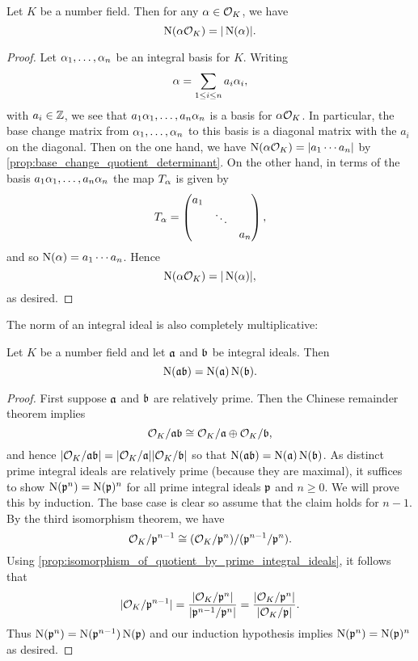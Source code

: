 \documentclass[12pt,oneside]{book}
\begin{document}
    \begin{proposition}\label{prop:ideal_and_field_norms_are_identical}
      Let $K$ be a number field. Then for any $\alpha \in \mathcal{O}_{K}$, we have
      \[
        \operatorname{\mathrm{N}}(\alpha\mathcal{O}_{K}) = |\operatorname{\mathrm{N}}(\alpha)|.
      \]
    \end{proposition}
    \begin{proof}
      Let $\alpha_{1},\ldots,\alpha_{n}$ be an integral basis for $K$. Writing
      \[
        \alpha = \sum_{1 \le i \le n}a_{i}\alpha_{i},
      \]
      with $a_{i} \in \mathbb{Z}$, we see that $a_{1}\alpha_{1},\ldots,a_{n}\alpha_{n}$ is a basis for $\alpha\mathcal{O}_{K}$. In particular, the base change matrix from $\alpha_{1},\ldots,\alpha_{n}$  to this basis is a diagonal matrix with the $a_{i}$ on the diagonal. Then on the one hand, we have $\operatorname{\mathrm{N}}(\alpha\mathcal{O}_{K}) = |a_{1} \cdots a_{n}|$ by \cref{prop:base_change_quotient_determinant}. On the other hand, in terms of the basis $a_{1}\alpha_{1},\ldots,a_{n}\alpha_{n}$ the map $T_{\alpha}$ is given by
      \[
        T_{\alpha} = \begin{pmatrix} a_{1} & & \\ & \ddots & \\ & & a_{n} \end{pmatrix},
      \]
      and so $\operatorname{\mathrm{N}}(\alpha) = a_{1} \cdots a_{n}$. Hence
      \[
        \operatorname{\mathrm{N}}(\alpha\mathcal{O}_{K}) = |\operatorname{\mathrm{N}}(\alpha)|,
      \]
      as desired.
    \end{proof}

    The norm of an integral ideal is also completely multiplicative:

    \begin{proposition}\label{prop:ideal_norm_is_multiplicative}
      Let $K$ be a number field and let $\mathfrak{a}$ and $\mathfrak{b}$ be integral ideals. Then
      \[
        \operatorname{\mathrm{N}}(\mathfrak{a}\mathfrak{b}) = \operatorname{\mathrm{N}}(\mathfrak{a})\operatorname{\mathrm{N}}(\mathfrak{b}).
      \]
    \end{proposition}
    \begin{proof}
      First suppose $\mathfrak{a}$ and $\mathfrak{b}$ are relatively prime. Then the Chinese remainder theorem implies
      \[
        \mathcal{O}_{K}/\mathfrak{a}\mathfrak{b} \cong \mathcal{O}_{K}/\mathfrak{a} \oplus \mathcal{O}_{K}/\mathfrak{b},
      \]
      and hence $|\mathcal{O}_{K}/\mathfrak{a}\mathfrak{b}| = |\mathcal{O}_{K}/\mathfrak{a}||\mathcal{O}_{K}/\mathfrak{b}|$ so that $\operatorname{\mathrm{N}}(\mathfrak{a}\mathfrak{b}) = \operatorname{\mathrm{N}}(\mathfrak{a})\operatorname{\mathrm{N}}(\mathfrak{b})$. As distinct prime integral ideals are relatively prime (because they are maximal), it suffices to show $\operatorname{\mathrm{N}}(\mathfrak{p}^{n}) = \operatorname{\mathrm{N}}(\mathfrak{p})^{n}$ for all prime integral ideals $\mathfrak{p}$ and $n \ge 0$. We will prove this by induction. The base case is clear so assume that the claim holds for $n-1$. By the third isomorphism theorem, we have
      \[
        \mathcal{O}_{K}/\mathfrak{p}^{n-1} \cong (\mathcal{O}_{K}/\mathfrak{p}^{n})/(\mathfrak{p}^{n-1}/\mathfrak{p}^{n}).
      \]
      Using \cref{prop:isomorphism_of_quotient_by_prime_integral_ideals}, it follows that
      \[
        |\mathcal{O}_{K}/\mathfrak{p}^{n-1}| = \frac{|\mathcal{O}_{K}/\mathfrak{p}^{n}|}{|\mathfrak{p}^{n-1}/\mathfrak{p}^{n}|} = \frac{|\mathcal{O}_{K}/\mathfrak{p}^{n}|}{|\mathcal{O}_{K}/\mathfrak{p}|}.
      \]
      Thus $\operatorname{\mathrm{N}}(\mathfrak{p}^{n}) = \operatorname{\mathrm{N}}(\mathfrak{p}^{n-1})\operatorname{\mathrm{N}}(\mathfrak{p})$ and our induction hypothesis implies $\operatorname{\mathrm{N}}(\mathfrak{p}^{n}) = \operatorname{\mathrm{N}}(\mathfrak{p})^{n}$ as desired.
    \end{proof}
\end{document}
